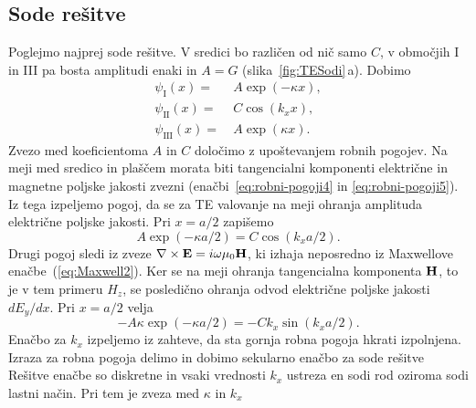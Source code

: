 \subsection*{Sode rešitve}
Poglejmo najprej sode rešitve. V sredici bo različen od nič samo $C$, 
v območjih I in III pa bosta amplitudi enaki in $A = G$ (slika~\ref{fig:TESodi}\,a). 
Dobimo 
\begin{align}
\psi_{\mathrm{I}}(x) =&~ A \exp(-\kappa x), \\
\psi_{\mathrm{II}}(x) =&~ C \cos(k_x x),\\
\psi_{\mathrm{III}}(x) =&~ A \exp(\kappa x).
\end{align}
Zvezo med koeficientoma $A$ in $C$ določimo z upoštevanjem robnih pogojev. Na meji
med sredico in plaščem morata biti tangencialni komponenti 
električne in magnetne poljske jakosti zvezni (enačbi~\ref{eq:robni-pogoji4} in 
\ref{eq:robni-pogoji5}). Iz tega izpeljemo pogoj, da se za TE valovanje
na meji ohranja amplituda električne poljske jakosti. Pri $x = a/2$ zapišemo
\begin{equation}
A \exp(-\kappa a/2) = C \cos(k_x a/2).
\end{equation}
Drugi pogoj sledi iz zveze $\nabla\times{\bf E}=i\omega\mu_{0}{\bf H}$, ki izhaja
neposredno iz Maxwellove enačbe~(\ref{eq:Maxwell2}). Ker se na meji ohranja
tangencialna komponenta ${\bf H}$, to je v tem primeru $H_z$, se posledično ohranja 
odvod električne poljske jakosti $dE_y/dx$. 
Pri $x = a/2$  velja
\begin{equation}
-A \kappa \exp(-\kappa a/2) = -C k_x \sin(k_x a/2).
\end{equation}
Enačbo za $k_x$ izpeljemo iz zahteve, da sta gornja robna 
pogoja hkrati izpolnjena. Izraza za robna pogoja delimo in dobimo sekularno 
enačbo za sode rešitve 
Rešitve enačbe so diskretne in vsaki vrednosti $k_x$ ustreza 
en sodi rod oziroma sodi lastni način. Pri tem je zveza med $\kappa$ in $k_x$  

